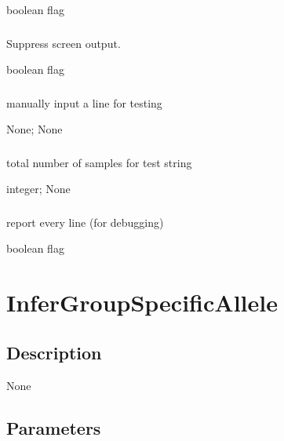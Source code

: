 \documentclass[letterpaper,11pt,english]{sphinxmanual}
\begin{document}
 boolean flag


\subsubsection{}
\label{\detokenize{prog_desc:id97}}
 Suppress screen output.

 boolean flag


\subsubsection{}
\label{\detokenize{prog_desc:test}}
 manually input a line for testing

 None;  None


\subsubsection{}
\label{\detokenize{prog_desc:test-nchar-textnchar}}
 total number of samples for test string

 integer;  None


\subsubsection{}
\label{\detokenize{prog_desc:verbose}}
 report every line (for debugging)

 boolean flag


\section{InferGroupSpecificAllele}
\label{\detokenize{prog_desc:infergroupspecificallele}}

\subsection{Description}
\label{\detokenize{prog_desc:id98}}
None


\subsection{Parameters}
\label{\detokenize{prog_desc:id99}}
\end{document}
